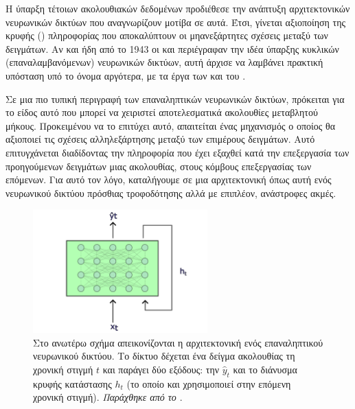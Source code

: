 Η ύπαρξη τέτοιων ακολουθιακών δεδομένων προδιέθεσε την ανάπτυξη αρχιτεκτονικών νευρωνικών δικτύων που αναγνωρίζουν μοτίβα σε αυτά. Έτσι, γίνεται αξιοποίηση της κρυφής () πληροφορίας που αποκαλύπτουν οι μη\textendash ανεξάρτητες σχέσεις μεταξύ των δειγμάτων. Αν και ήδη από το 1943 οι  και \cite{mcculloch1943logical} περιέγραφαν την ιδέα ύπαρξης κυκλικών (επαναλαμβανόμενων) νευρωνικών δικτύων, αυτή άρχισε να λαμβάνει πρακτική υπόσταση υπό το όνομα  αργότερα, με τα έργα των  \cite{rumelhart1985learning_internal_representations} και του  \cite{jordan1997serial}. \par

Σε μια πιο τυπική περιγραφή των επαναληπτικών νευρωνικών δικτύων, πρόκειται για το είδος αυτό που μπορεί να χειριστεί αποτελεσματικά ακολουθίες μεταβλητού μήκους\cite{geron2019hands}. Προκειμένου να το επιτύχει αυτό, απαιτείται ένας μηχανισμός ο οποίος θα αξιοποιεί τις σχέσεις αλληλεξάρτησης μεταξύ των επιμέρους δειγμάτων. Αυτό επιτυγχάνεται διαδίδοντας την πληροφορία που έχει εξαχθεί κατά την επεξεργασία των προηγούμενων δειγμάτων μιας ακολουθίας, στους κόμβους επεξεργασίας των επόμενων\cite{youtubeRNN}. Για αυτό τον λόγο, καταλήγουμε σε μια αρχιτεκτονική όπως αυτή ενός νευρωνικού δικτύου πρόσθιας τροφοδότησης αλλά με επιπλέον, ανάστροφες ακμές\cite{geron2019hands}. \par

\begin{figure}[h]
  \centering
  \includegraphics[width=0.6\textwidth]{images/chapter theoritical background/rnn_not unrolled.pdf}
  \caption{Στο ανωτέρω σχήμα απεικονίζονται η αρχιτεκτονική ενός επαναληπτικού νευρωνικού δικτύου. Το δίκτυο δέχεται ένα δείγμα ακολουθίας τη χρονική στιγμή $t$ και παράγει δύο εξόδους: την $\hat{y}_t$ και το διάνυσμα κρυφής κατάστασης $h_{t}$ (το οποίο και χρησιμοποιεί στην επόμενη χρονική στιγμή). \textit{Παράχθηκε από το \href{https://inkscape.org/}{}}.}
  \label{fig:rnn_simple}
\end{figure}

